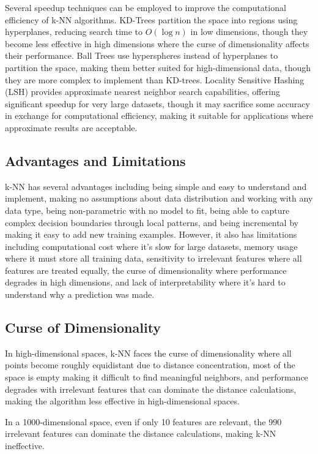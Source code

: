 Several speedup techniques can be employed to improve the computational efficiency of k-NN algorithms. KD-Trees partition the space into regions using hyperplanes, reducing search time to $O(\log n)$ in low dimensions, though they become less effective in high dimensions where the curse of dimensionality affects their performance. Ball Trees use hyperspheres instead of hyperplanes to partition the space, making them better suited for high-dimensional data, though they are more complex to implement than KD-trees. Locality Sensitive Hashing (LSH) provides approximate nearest neighbor search capabilities, offering significant speedup for very large datasets, though it may sacrifice some accuracy in exchange for computational efficiency, making it suitable for applications where approximate results are acceptable.

\subsection{Advantages and Limitations}

k-NN has several advantages including being simple and easy to understand and implement, making no assumptions about data distribution and working with any data type, being non-parametric with no model to fit, being able to capture complex decision boundaries through local patterns, and being incremental by making it easy to add new training examples. However, it also has limitations including computational cost where it's slow for large datasets, memory usage where it must store all training data, sensitivity to irrelevant features where all features are treated equally, the curse of dimensionality where performance degrades in high dimensions, and lack of interpretability where it's hard to understand why a prediction was made.

\subsection{Curse of Dimensionality}

In high-dimensional spaces, k-NN faces the curse of dimensionality where all points become roughly equidistant due to distance concentration, most of the space is empty making it difficult to find meaningful neighbors, and performance degrades with irrelevant features that can dominate the distance calculations, making the algorithm less effective in high-dimensional spaces.

\begin{example}
In a 1000-dimensional space, even if only 10 features are relevant, the 990 irrelevant features can dominate the distance calculations, making k-NN ineffective.
\end{example}

